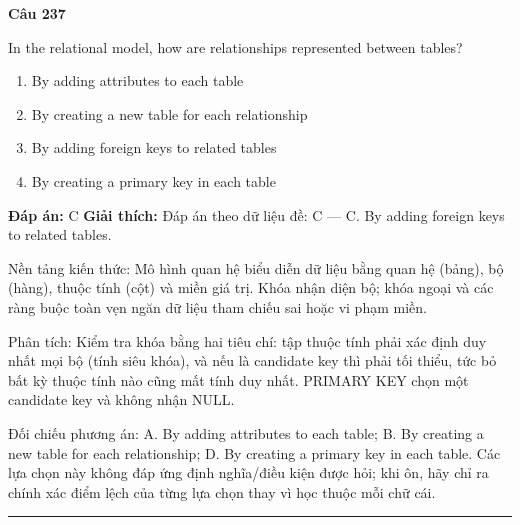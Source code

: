 \documentclass[11pt,a4paper]{article}
\newenvironment{question}[1]{%
  \par\vspace{1em}\noindent\textbf{\large Câu #1}\par\vspace{0.4em}
}{%
  \par\vspace{1em}\hrule\vspace{0.6em}
}
\newenvironment{choices}{%
  \begin{enumerate}[label=\textbf{\Alph*.},leftmargin=2.2em,itemsep=2pt,topsep=3pt]
}{%
  \end{enumerate}
}
\newcommand{\choice}{\item}
\begin{document}
\begin{question}{237}
In the relational model, how are relationships represented between tables?
\begin{choices}
\choice By adding attributes to each table
\choice By creating a new table for each relationship
\choice By adding foreign keys to related tables
\choice By creating a primary key in each table
\end{choices}
\textbf{Đáp án:} C
\textbf{Giải thích:} Đáp án theo dữ liệu đề: C — C. By adding foreign keys to related tables.

Nền tảng kiến thức: Mô hình quan hệ biểu diễn dữ liệu bằng quan hệ (bảng), bộ (hàng), thuộc tính (cột) và miền giá trị. Khóa nhận diện bộ; khóa ngoại và các ràng buộc toàn vẹn ngăn dữ liệu tham chiếu sai hoặc vi phạm miền.

Phân tích: Kiểm tra khóa bằng hai tiêu chí: tập thuộc tính phải xác định duy nhất mọi bộ (tính siêu khóa), và nếu là candidate key thì phải tối thiểu, tức bỏ bất kỳ thuộc tính nào cũng mất tính duy nhất. PRIMARY KEY chọn một candidate key và không nhận NULL.

Đối chiếu phương án: A. By adding attributes to each table; B. By creating a new table for each relationship; D. By creating a primary key in each table. Các lựa chọn này không đáp ứng định nghĩa/điều kiện được hỏi; khi ôn, hãy chỉ ra chính xác điểm lệch của từng lựa chọn thay vì học thuộc mỗi chữ cái.
\end{question}
\end{document}
